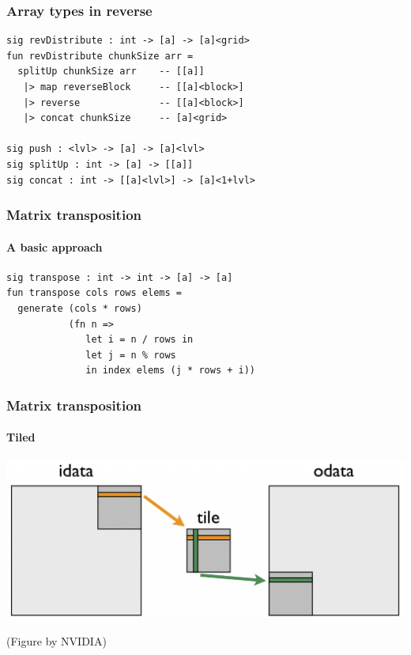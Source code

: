 \documentclass{beamer}
\begin{document}
\begin{frame}[fragile]
  \frametitle{Array types in reverse}
\begin{verbatim}
sig revDistribute : int -> [a] -> [a]<grid>
fun revDistribute chunkSize arr =
  splitUp chunkSize arr    -- [[a]]
   |> map reverseBlock     -- [[a]<block>]
   |> reverse              -- [[a]<block>]
   |> concat chunkSize     -- [a]<grid>

sig push : <lvl> -> [a] -> [a]<lvl>
sig splitUp : int -> [a] -> [[a]]
sig concat : int -> [[a]<lvl>] -> [a]<1+lvl>
\end{verbatim}

\end{frame}

\begin{frame}[fragile]
  \frametitle{Matrix transposition}
  \framesubtitle{A basic approach}

\begin{verbatim}
sig transpose : int -> int -> [a] -> [a]
fun transpose cols rows elems =
  generate (cols * rows)
           (fn n =>
              let i = n / rows in
              let j = n % rows
              in index elems (j * rows + i))
\end{verbatim}

\end{frame}

\begin{frame}[fragile]
  \frametitle{Matrix transposition}
  \framesubtitle{Tiled}

\includegraphics[width=\textwidth]{../sharedTranspose-1024x409.jpg}

\quad(Figure by NVIDIA)
\end{frame}
\end{document}
